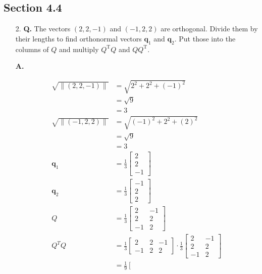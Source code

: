 \documentclass[main.tex]{subfiles}
\begin{document}
\subsection{Section 4.4}
\begin{enumerate}
    \item [2.] \textbf{Q.} The vectors $(2,2,-1)$ and $(-1,2,2)$ are orthogonal. Divide them by their lengths to find orthonormal vectors $\bm{q}_{1}$ and $\bm{q}_{2}$. Put those into the columns of $Q$ and multiply $Q^{\mathrm{T}} Q$ and $Q Q^{\mathrm{T}}$. 
    
    \textbf{A.}  
    
    $$
    \begin{aligned}
    \sqrt{\|(2,2,-1)\|} &=\sqrt{2^{2}+2^{2}+(-1)^{2}} \\
    &=\sqrt{9} \\
    &=3 \\
    \sqrt{\|(-1,2,2)\|} &=\sqrt{(-1)^{2}+2^{2}+(2)^{2}} \\
    &=\sqrt{9} \\
    &=3 \\
    \bm{q}_{1}&=\frac{1}{3}\left[\begin{array}{c}
    2 \\
    2 \\
    -1
    \end{array}\right] \\
    \bm{q}_{2}&=\frac{1}{3}\left[\begin{array}{c}
    -1 \\
    2 \\
    2
    \end{array}\right] \\
    Q&=\frac{1}{3}\left[\begin{array}{cc}
    2 & -1 \\
    2 & 2 \\
    -1 & 2
    \end{array}\right]\\
    Q^{T} Q &=\frac{1}{3}\left[\begin{array}{ccc}
    2 & 2 & -1 \\
    -1 & 2 & 2
    \end{array}\right] \cdot \frac{1}{3}\left[\begin{array}{cc}
    2 & -1 \\
    2 & 2 \\
    -1 & 2
    \end{array}\right] \\
    &=\frac{1}{9}\left[\begin{array}{ll}

\end{array}
\end{aligned}$$
\end{enumerate}
\end{document}
